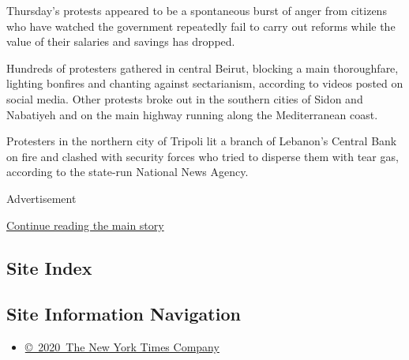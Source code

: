 Thursday's protests appeared to be a spontaneous burst of anger from
citizens who have watched the government repeatedly fail to carry out
reforms while the value of their salaries and savings has dropped.

Hundreds of protesters gathered in central Beirut, blocking a main
thoroughfare, lighting bonfires and chanting against sectarianism,
according to videos posted on social media. Other protests broke out in
the southern cities of Sidon and Nabatiyeh and on the main highway
running along the Mediterranean coast.

Protesters in the northern city of Tripoli lit a branch of Lebanon's
Central Bank on fire and clashed with security forces who tried to
disperse them with tear gas, according to the state-run National News
Agency.

Advertisement

\protect\hyperlink{after-bottom}{Continue reading the main story}

\hypertarget{site-index}{%
\subsection{Site Index}\label{site-index}}

\hypertarget{site-information-navigation}{%
\subsection{Site Information
Navigation}\label{site-information-navigation}}

\begin{itemize}
\tightlist
\item
  \href{https://help.nytimes.com/hc/en-us/articles/115014792127-Copyright-notice}{©~2020~The
  New York Times Company}
\end{itemize}

